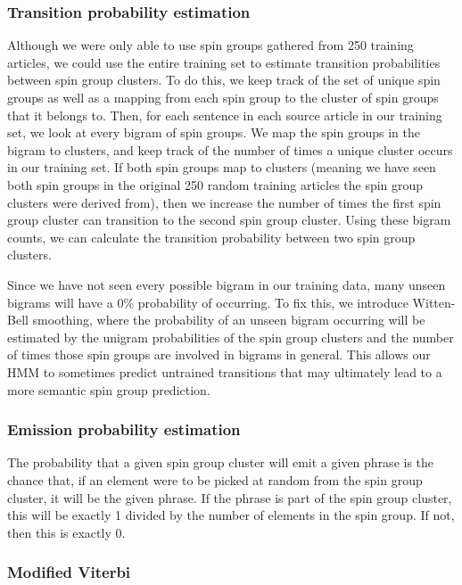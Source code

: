 \documentclass[11pt,letterpaper,oneside, titlepage]{scrartcl}
\begin{document}
\subsubsection{Transition probability estimation}

Although we were only able to use spin groups gathered from 250 training articles, we could use the entire training set to estimate transition probabilities between spin group clusters. To do this, we keep track of the set of unique spin groups as well as a mapping from each spin group to the cluster of spin groups that it belongs to. Then, for each sentence in each source article in our training set, we look at every bigram of spin groups. We map the spin groups in the bigram to clusters, and keep track of the number of times a unique cluster occurs in our training set. If both spin groups map to clusters (meaning we have seen both spin groups in the original 250 random training articles the spin group clusters were derived from), then we increase the number of times the first spin group cluster can transition to the second spin group cluster. Using these bigram counts, we can calculate the transition probability between two spin group clusters.

Since we have not seen every possible bigram in our training data, many unseen bigrams will have a 0\% probability of occurring. To fix this, we introduce Witten-Bell smoothing, where the probability of an unseen bigram occurring will be estimated by the unigram probabilities of the spin group clusters and the number of times those spin groups are involved in bigrams in general. This allows our HMM to sometimes predict untrained transitions that may ultimately lead to a more semantic spin group prediction.

\subsubsection{Emission probability estimation}

The probability that a given spin group cluster will emit a given phrase is the chance that, if an element were to be picked at random from the spin group cluster, it will be the given phrase. If the phrase is part of the spin group cluster, this will be exactly 1 divided by the number of elements in the spin group. If not, then this is exactly 0.

\subsubsection{Modified Viterbi}
\end{document}
